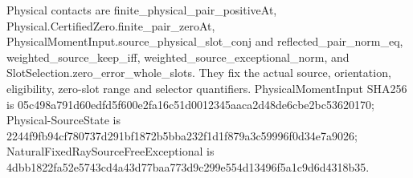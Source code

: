 \documentclass[11pt,a4paper]{article}
\newcommand{\sourcecode}[1]{{\small\ttfamily #1}}
\begin{document}
Physical contacts are \sourcecode{finite\_\allowbreak{}\allowbreak{}physical\_\allowbreak{}\allowbreak{}pair\_\allowbreak{}\allowbreak{}positive\allowbreak{}At},
\sourcecode{Physical.\allowbreak{}Certified\allowbreak{}Zero.\allowbreak{}finite\_\allowbreak{}\allowbreak{}pair\_\allowbreak{}\allowbreak{}zero\allowbreak{}At},
\sourcecode{Physical\allowbreak{}Moment\allowbreak{}Input.\allowbreak{}source\_\allowbreak{}\allowbreak{}physical\_\allowbreak{}\allowbreak{}slot\_\allowbreak{}\allowbreak{}conj} and
\sourcecode{reflected\_\allowbreak{}\allowbreak{}pair\_\allowbreak{}\allowbreak{}norm\_\allowbreak{}\allowbreak{}eq},
\sourcecode{weighted\_\allowbreak{}\allowbreak{}source\_\allowbreak{}\allowbreak{}keep\_\allowbreak{}\allowbreak{}iff},
\sourcecode{weighted\_\allowbreak{}\allowbreak{}source\_\allowbreak{}\allowbreak{}exceptional\_\allowbreak{}\allowbreak{}norm}, and
\sourcecode{Slot\allowbreak{}Selection.\allowbreak{}zero\_\allowbreak{}\allowbreak{}error\_\allowbreak{}\allowbreak{}whole\_\allowbreak{}\allowbreak{}slots}. They fix the actual
source, orientation, eligibility, zero-slot range and selector
quantifiers. \sourcecode{Physical\allowbreak{}Moment\allowbreak{}Input} SHA256 is
\sourcecode{05c498a7\allowbreak{}91d60edf\allowbreak{}d5f600e2\allowbreak{}fa16c51d\allowbreak{}0012345a\allowbreak{}aca2d48d\allowbreak{}e6cbe2bc\allowbreak{}53620170};
Physical-\sourcecode{Source\allowbreak{}State} is
\sourcecode{2244f9fb\allowbreak{}94cf7807\allowbreak{}37d291bf\allowbreak{}1872b5bb\allowbreak{}a232f1d1\allowbreak{}f879a3c5\allowbreak{}9996f0d3\allowbreak{}4e7a9026};
\sourcecode{Natural\allowbreak{}Fixed\allowbreak{}Ray\allowbreak{}Source\allowbreak{}Free\allowbreak{}Exceptional} is
\sourcecode{4dbb1822\allowbreak{}fa52e574\allowbreak{}3cd4a43d\allowbreak{}77baa773\allowbreak{}d9c299e5\allowbreak{}54d13496\allowbreak{}f5a1c9d6\allowbreak{}d4318b35}.
\end{document}
